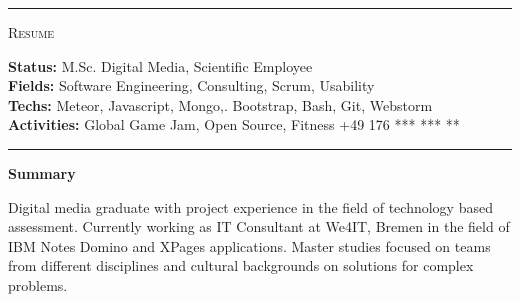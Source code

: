 \documentclass[10pt,A4]{article}
\newcommand{\cvsection}[1]
{
	\begin{center}
		\large\textcolor{sectcol}{\textbf{#1}}
	\end{center}
}
\newcommand{\metasection}[2]
{
\footnotesize{#2} \hspace*{\fill} \footnotesize{#1}\\[1pt]
}
\begin{document}
\pagestyle{fancy}	








\vspace{-8pt}
\begin{center}
	\HUGE \textsc{\cvname} \textcolor{sectcol}{\rule[-1mm]{1mm}{0.9cm}} \textsc{Resume}\\[2pt]
	\small \cvposition
\end{center}



\vspace{6pt}


\metasection{\cvuniversity}{\textbf{Status:} M.Sc. Digital Media, Scientific Employee}
\metasection{\cvuniversity}{\textbf{Fields:} Software Engineering, Consulting, Scrum, Usability} 
\metasection{\cvemail}{\textbf{Techs:} Meteor, Javascript, Mongo,. Bootstrap, Bash, Git, Webstorm}
\metasection{+49 176 *** *** **}{\textbf{Activities:} Global Game Jam, Open Source, Fitness}
\vspace{-2pt}
\textcolor{softcol}{\hrule}
\vspace{6pt}

\normalsize

\vspace{-6pt}
\cvsection{Summary}
Digital media graduate with project experience in the field of technology based assessment. Currently working as IT Consultant at We4IT, Bremen in the field of IBM Notes Domino and XPages applications. Master studies focused on teams from different disciplines and cultural backgrounds on solutions for complex problems.\\
\end{document}

